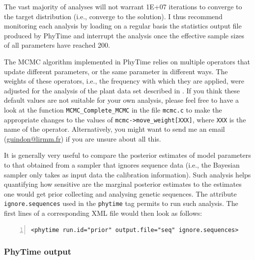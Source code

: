 \documentclass[a4paper,12pt]{article}
\newcommand{\x}[1]{\texttt{#1}}
\begin{document}
The vast majority of analyses will not warrant 1E+07 iterations  to converge to the target
distribution (i.e., converge to the solution). I thus recommend  monitoring each analysis by loading
on a regular basis the statistics output file produced by PhyTime and interrupt the analysis once
the effective sample sizes of all parameters have reached 200.  

The MCMC algorithm implemented in
PhyTime relies on multiple operators that update different parameters, or the same parameter in
different ways. The weights of these operators, i.e., the frequency with which they are applied,
were adjusted for the analysis of the plant data set described in \cite{guindon17}. If you think
these default values are not suitable for your own analysis, please feel free to have a look at the
function \x{MCMC\_Complete\_MCMC} in the file \x{mcmc.c} to make  the appropriate changes to the
values of \x{mcmc->move\_weight[XXX]}, where \x{XXX} is the name of the operator. Alternatively, you
might want to send me an email (\url{guindon@lirmm.fr}) if you are unsure about all this. 

It is generally very useful to compare the posterior estimates of model parameters to that obtained
from a sampler that ignores sequence data (i.e., the Bayesian sampler only takes as input data the
calibration information). Such analysis helps quantifying how sensitive are the marginal posterior
estimates to the estimates one would get prior collecting and analysing genetic sequences. The
attribute \x{ignore.sequences} used in the \x{phytime} tag permits to run such analysis. The first
lines of a corresponding XML file would then look as follows:

\vspace{0.2cm}
\begin{Verbatim}[frame=single, label=Sampling from the prior in PhyTime, samepage=true, baselinestretch=0.5,
  fontsize=\small, numbers=left]
<phytime run.id="prior" output.file="seq" ignore.sequences>
\end{Verbatim}

\subsubsection{PhyTime output}
\end{document}
